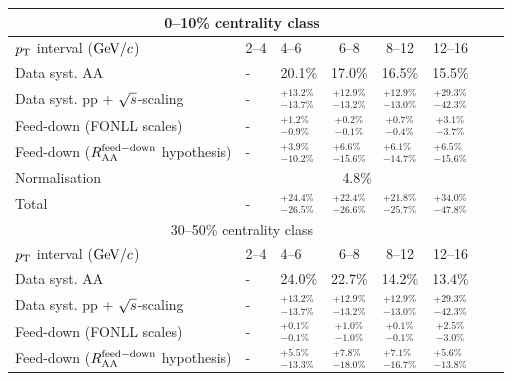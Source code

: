 \begin{table}[!h]
\centering
\begin{tabular}{|l|l|l|c|c|c|c|c|}
\hline
\multicolumn{6}{|c|}{0--10\% centrality class}       \\                                                                                                                                                                                                                                               \hline
$p_{\rm T}$ interval ($\mathrm{GeV}/c$)     & 2--4    &    4--6          & 6--8      &   8--12            & 12--16                  \\ 
\hline
Data syst. AA    &   -     & 20.1\%  & 17.0\%  & 16.5\%  & 15.5\% \\
Data syst. pp + $\sqrt{s}$-scaling  &   -      & $^{+13.2\%}_{-13.7\%}$  & $^{+12.9\%}_{-13.2\%}$  & $^{+12.9\%}_{-13.0\%}$  & $^{+29.3\%}_{-42.3\%}$\\
Feed-down (FONLL scales)  &   -    & $^{+1.2\%}_{-0.9\%}$  & $^{+0.2\%}_{-0.1\%}$  & $^{+0.7\%}_{-0.4\%}$  & $^{+3.1\%}_{-3.7\%}$ \\
Feed-down ($R_{\rm AA}^{\rm feed-down}$ hypothesis)   &   -        & $^{+3.9\%}_{-10.2\%}$  & $^{+6.6\%}_{-15.6\%}$  & $^{+6.1\%}_{-14.7\%}$  & $^{+6.5\%}_{-15.6\%}$\\
\hline
Normalisation     & \multicolumn{5}{|c|}{4.8\%} \\
\hline
\hline
Total  &   - & $^{+24.4\%}_{-26.5\%}$  & $^{+22.4\%}_{-26.6\%}$  & $^{+21.8\%}_{-25.7\%}$  & $^{+34.0\%}_{-47.8\%}$\\
\hline
\hline
\multicolumn{6}{|c|}{30--50\% centrality class}       \\                                                                                                                                                                                                                                               \hline
$p_{\rm T}$ interval ($\mathrm{GeV}/c$) & 2--4        &    4--6          & 6--8      &   8--12            & 12--16                  \\ 
\hline
Data syst. AA       &   -     & 24.0\%  & 22.7\%  & 14.2\%  & 13.4\%\\
Data syst. pp + $\sqrt{s}$-scaling  &   -  & $^{+13.2\%}_{-13.7\%}$  & $^{+12.9\%}_{-13.2\%}$  & $^{+12.9\%}_{-13.0\%}$  & $^{+29.3\%}_{-42.3\%}$ \\
Feed-down (FONLL scales)   &   -   & $^{+0.1\%}_{-0.1\%}$  & $^{+1.0\%}_{-1.0\%}$  & $^{+0.1\%}_{-0.1\%}$  & $^{+2.5\%}_{-3.0\%}$   \\
Feed-down ($R_{\rm AA}^{\rm feed-down}$ hypothesis)  &   -       & $^{+5.5\%}_{-13.3\%}$  & $^{+7.8\%}_{-18.0\%}$  & $^{+7.1\%}_{-16.7\%}$  & $^{+5.6\%}_{-13.8\%}$\\

\end{tabular}
\end{table}

